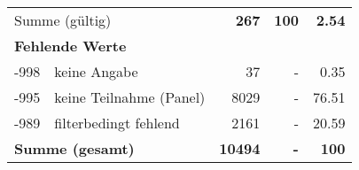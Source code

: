 \begin{longtable}{lXrrr}
     \midrule
     \multicolumn{2}{l}{Summe (gültig)} &
       \textbf{\num{267}} &
     \textbf{\num{100}} &
       \textbf{\num[round-mode=places,round-precision=2]{2.54}} \\
     \multicolumn{5}{l}{\textbf{Fehlende Werte}}\\
       -998 &
       keine Angabe &
         \num{37} &
        - &
         \num[round-mode=places,round-precision=2]{0.35} \\
       -995 &
       keine Teilnahme (Panel) &
         \num{8029} &
        - &
         \num[round-mode=places,round-precision=2]{76.51} \\
       -989 &
       filterbedingt fehlend &
         \num{2161} &
        - &
         \num[round-mode=places,round-precision=2]{20.59} \\
     \midrule
     \multicolumn{2}{l}{\textbf{Summe (gesamt)}} &
          \textbf{\num{10494}} &
        \textbf{-} &
        \textbf{\num{100}} \\
     \bottomrule
     \end{longtable}
     
